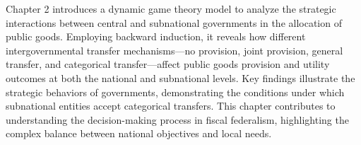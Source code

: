 

Chapter 2 introduces a dynamic game theory model to analyze the strategic interactions between central and subnational governments in the allocation of public goods. Employing backward induction, it reveals how different intergovernmental transfer mechanisms—no provision, joint provision, general transfer, and categorical transfer—affect public goods provision and utility outcomes at both the national and subnational levels. Key findings illustrate the strategic behaviors of governments, demonstrating the conditions under which subnational entities accept categorical transfers. This chapter contributes to understanding the decision-making process in fiscal federalism, highlighting the complex balance between national objectives and local needs.




